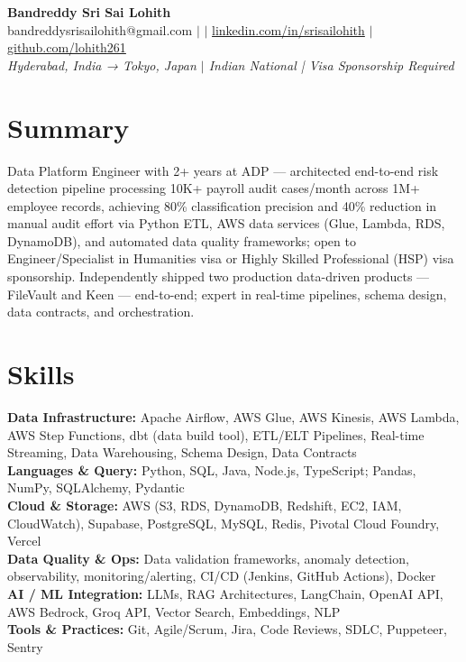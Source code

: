 \documentclass[10pt,letterpaper]{article}
\newcommand{\skillrow}[2]{\textbf{#1:} #2 \\[1pt]}
\begin{document}
\begin{center}
  {\Huge\bfseries Bandreddy Sri Sai Lohith}\\[3pt]
  \small bandreddysrisailohith@gmail.com $\vert$ $\vert$\; \href{https://linkedin.com/in/srisailohith}{linkedin.com/in/srisailohith} $\vert$\; \href{https://github.com/lohith261}{github.com/lohith261} \\[2pt]
  \small\textit{Hyderabad, India → Tokyo, Japan $\vert$\; Indian National | Visa Sponsorship Required}
\end{center}

\section{Summary}

Data Platform Engineer with 2+ years at ADP --- architected end-to-end risk detection pipeline processing 10K+ payroll audit cases/month across 1M+ employee records, achieving 80\% classification precision and 40\% reduction in manual audit effort via Python ETL, AWS data services (Glue, Lambda, RDS, DynamoDB), and automated data quality frameworks; open to Engineer/Specialist in Humanities visa or Highly Skilled Professional (HSP) visa sponsorship.
      Independently shipped two production data-driven products --- FileVault and Keen --- end-to-end; expert in real-time pipelines, schema design, data contracts, and orchestration.

\section{Skills}

\skillrow{Data Infrastructure}{Apache Airflow, AWS Glue, AWS Kinesis, AWS Lambda, AWS Step Functions, dbt (data build tool), ETL/ELT Pipelines, Real-time Streaming, Data Warehousing, Schema Design, Data Contracts}
\skillrow{Languages \& Query}{Python, SQL, Java, Node.js, TypeScript; Pandas, NumPy, SQLAlchemy, Pydantic}
\skillrow{Cloud \& Storage}{AWS (S3, RDS, DynamoDB, Redshift, EC2, IAM, CloudWatch), Supabase, PostgreSQL, MySQL, Redis, Pivotal Cloud Foundry, Vercel}
\skillrow{Data Quality \& Ops}{Data validation frameworks, anomaly detection, observability, monitoring/alerting, CI/CD (Jenkins, GitHub Actions), Docker}
\skillrow{AI / ML Integration}{LLMs, RAG Architectures, LangChain, OpenAI API, AWS Bedrock, Groq API, Vector Search, Embeddings, NLP}
\skillrow{Tools \& Practices}{Git, Agile/Scrum, Jira, Code Reviews, SDLC, Puppeteer, Sentry}
\end{document}
